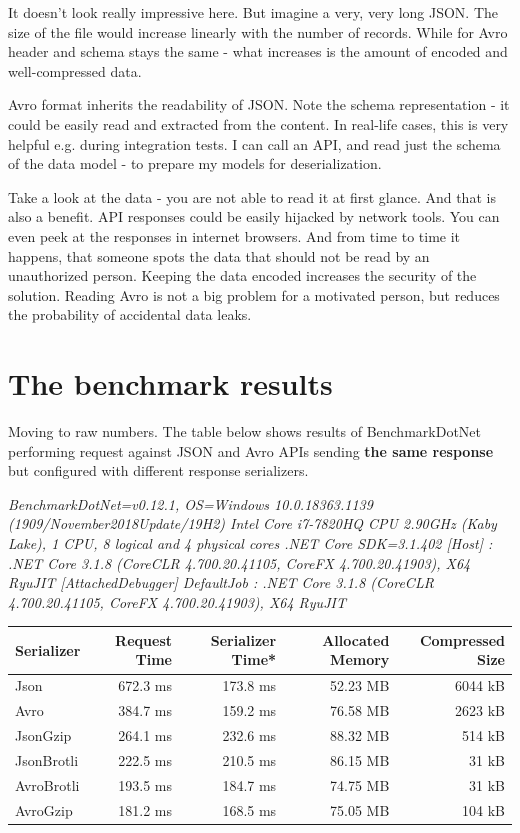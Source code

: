 \documentclass[]{article}
\begin{document}
It doesn't look really impressive here. But imagine a very, very long JSON. The size of the file would increase linearly with the number of records. While for Avro header and schema stays the same - what increases is the amount of encoded and well-compressed data.

Avro format inherits the readability of JSON. Note the schema representation - it could be easily read and extracted from the content. In real-life cases, this is very helpful e.g. during integration tests. I can call an API, and read just the schema of the data model - to prepare my models for deserialization.

Take a look at the data - you are not able to read it at first glance. And that is also a benefit. API responses could be easily hijacked by network tools. You can even peek at the responses in internet browsers. And from time to time it happens, that someone spots the data that should not be read by an unauthorized person. Keeping the data encoded increases the security of the solution. Reading Avro is not a big problem for a motivated person, but reduces the probability of accidental data leaks.



\section{The benchmark results}

Moving to raw numbers. The table below shows results of BenchmarkDotNet performing request against JSON and Avro APIs sending \textbf{the same response} but configured with different response serializers.
\medskip

{\tiny
\emph{
BenchmarkDotNet=v0.12.1, OS=Windows 10.0.18363.1139 (1909/November2018Update/19H2)
Intel Core i7-7820HQ CPU 2.90GHz (Kaby Lake), 1 CPU, 8 logical and 4 physical cores
.NET Core SDK=3.1.402
  [Host]     : .NET Core 3.1.8 (CoreCLR 4.700.20.41105, CoreFX 4.700.20.41903), X64 RyuJIT  [AttachedDebugger]
  DefaultJob : .NET Core 3.1.8 (CoreCLR 4.700.20.41105, CoreFX 4.700.20.41903), X64 RyuJIT
}
}

\begin{center}
 \begin{tabular}{||l r r r r ||} 
 \hline
 Serializer & Request Time & Serializer Time* & Allocated Memory & Compressed Size \\ [0.5ex] 
 \hline\hline
 Json          &	672.3 ms & 173.8 ms &	52.23 MB &	6044 kB \\ 
 \hline
 Avro          &	384.7 ms & 159.2 ms &	76.58 MB &	2623 kB \\
 \hline
 JsonGzip      &	264.1 ms & 232.6 ms &	88.32 MB &	514 kB \\
 \hline
 JsonBrotli	   &	222.5 ms & 210.5 ms &	86.15 MB &	31 kB \\ 
 \hline
  AvroBrotli   &	193.5 ms & 184.7 ms &   74.75 MB &  31 kB \\
 \hline
  AvroGzip      &	181.2 ms & 168.5 ms &	75.05 MB &	104 kB \\
 \hline
\end{tabular}
\end{center}
\end{document}
